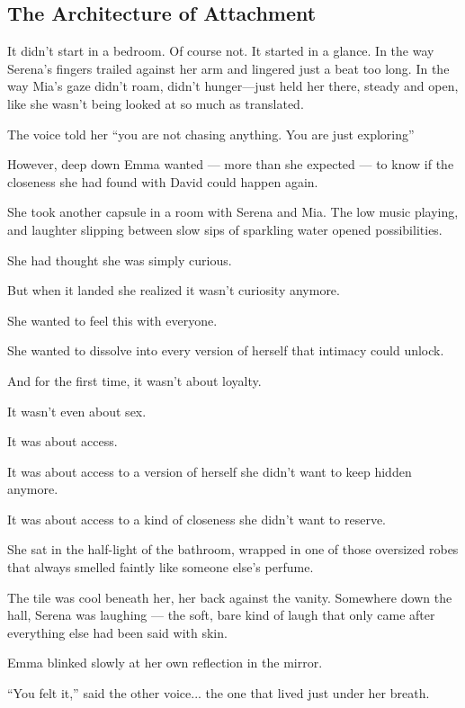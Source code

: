 
\subsection{The Architecture of Attachment}



It didn’t start in a bedroom.
Of course not.
It started in a glance. In the way Serena’s fingers trailed against her arm and lingered just a 
beat too long.
In the way Mia’s gaze didn’t roam, didn’t hunger—just held her there, steady and open, 
like she wasn’t being looked at so much as translated.

The voice told her ``you are not chasing anything. You are just exploring''

However, deep down Emma wanted --- more than she expected --- to know 
if the closeness she had found with David could happen again.

She took another capsule in a room with Serena and Mia. The low music playing, and laughter 
slipping between slow sips of sparkling water opened possibilities.

She had thought she was simply curious.

But when it landed she realized it wasn’t curiosity anymore.

She wanted to feel this with everyone.

She wanted to dissolve into every version of herself that intimacy could unlock.

And for the first time, it wasn’t about loyalty.

It wasn’t even about sex.

It was about access.

It was about access to a version of herself she didn’t want to keep hidden anymore.

It was about access to a kind of closeness she didn’t want to reserve.
  



She sat in the half-light of the bathroom, wrapped in one of those oversized robes that always smelled 
faintly like someone else’s perfume.

The tile was cool beneath her, her back against the vanity. Somewhere down the hall, Serena was 
laughing — the soft, bare kind of laugh that only came after everything else had been said with skin.

Emma blinked slowly at her own reflection in the mirror.

``You felt it,'' said the other voice... the one that lived just under her breath.

